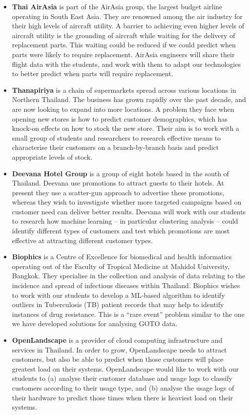\documentclass[11pt]{article}
\begin{document}
  \begin{itemize}[leftmargin=6mm,itemsep=-3pt,topsep=1pt]
    \item {\bf Thai AirAsia} is part of the AirAsia group, the largest budget airline operating in South East Asia. They are renowned among the air industry for their high levels of aircraft utility. A barrier to achieving even higher levels of aircraft utility is the grounding of aircraft while waiting for the delivery of replacement parts. This waiting could be reduced if we could predict when parts were likely to require replacement. AirAsia engineers will share their flight data with the students, and work with them to adapt our technologies to better predict when parts will require replacement.
    \item {\bf Thanapiriya} is a chain of supermarkets spread across various locations in Northern Thailand. The business has grown rapidly over the past decade, and are now looking to expand into more locations. A problem they face when opening new stores is how to predict customer demographics, which has knock-on effects on how to stock the new store. Their aim is to work with a small group of students and researchers to research effective means to characterise their customers on a branch-by-branch basis and predict appropriate levels of stock.
    \item {\bf Deevana Hotel Group} is a group of eight hotels based in the south of Thailand. Deevana use promotions to attract guests to their hotels. At present they use a scatter-gun approach to advertise these promotions, whereas they wish to investigate whether more targeted campaigns based on customer need can deliver better results. Deevana will work with our students to research how machine learning -- in particular clustering analysis -- could identify different types of customers and test which promotions are most effective at attracting different customer types.
    \item {\bf Biophics} is a Centre of Excellence for biomedical and health informatics operating out of the Faculty of Tropical Medicine at Mahidol University, Bangkok. They specialise in the collection and analysis of data relating to the incidence and spread of infectious diseases within Thailand. Biophics wishes to work with our students to develop a ML-based algorithm to identify outliers in Tuberculosis (TB) patient records that may help to identify instances of drug resistance. This is a ``rare event'' problem similar to the one we have developed solutions for analysing GOTO data.
    \item {\bf OpenLandscape} is a provider of cloud computing infrastructure and services in Thailand. In order to grow, OpenLandscape needs to attract customers, but also be able to predict when those customers will place greatest load on their systems. OpenLandscape would like to work with our students to (a) analyse their customer database and usage logs to classify customers according to their usage type, and (b) analyse the usage logs of their hardware to predict those times when there is heaviest load on their systems.
  \end{itemize}
\end{document}
